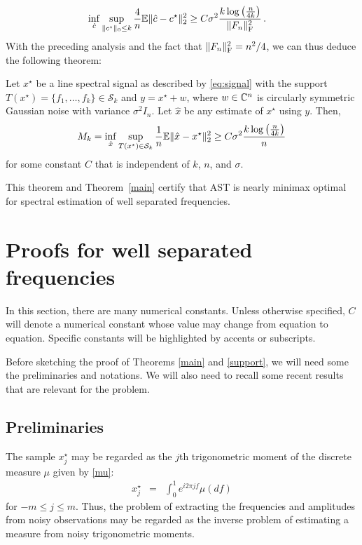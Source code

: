 \begin{align*}
\inf_{\hat{c}}
 \sup_{\lVert c^\star\rVert_0 \leq k} \frac{4}{n} \mathbb{E} \lVert\hat{c} - c^\star\rVert_2^2&\geq {C} \sigma^2 \frac{k \log\left(\frac{n}{4k}\right)}{\lVert F_n\rVert_\mathrm{F}^2}\,.
 \end{align*} With the preceding analysis and the fact that $\lVert F_n\rVert_{\mathrm{F}}^2 = n^2/4$, we can thus deduce the following theorem:
 \begin{theorem}
\label{minimax}
Let $x^\star$ be a line spectral signal as described by \eqref{eq:signal} with the support $T(x^\star) = \{f_1, \dots, f_k\} \in \mathcal{S}_k$ and $y = x^\star + w$, where $w \in \mathbb{C}^n$ is circularly symmetric Gaussian noise with variance $\sigma^2 I_n$. Let $\hat{x}$ be any estimate of $x^\star$ using $y$. Then,
\[
M_k = \inf_{\hat{x}}
 \sup_{
	T(x^\star) \in \mathcal{S}_k}
\frac{1}{n} \mathbb{E} \lVert\hat{x} - x^\star\rVert_2^2
\geq C\sigma^2 \frac{k \log\left(\frac{n}{4k}\right)}{n}
\]
for some constant $C$ that is independent of $k$, $n$, and $\sigma$.
\end{theorem}

This theorem and Theorem~\ref{main} certify that AST is nearly minimax optimal
for spectral estimation of well separated frequencies.

\section{Proofs for well separated frequencies}
\label{sec:proofs}

In this section, there are many numerical constants. Unless otherwise specified,
$C$ will denote a numerical constant whose value may change from equation to
equation. Specific constants will be highlighted by accents or subscripts.

Before sketching the proof of Theorems \ref{main} and \ref{support}, we will
need some the preliminaries and notations. We will also need to recall some
recent results that are relevant for the problem.

\subsection{Preliminaries} %
\label{sub:linespect:measures}
The sample $x^\star_j$ may be regarded as the $j$th trigonometric moment of 
the discrete measure $\mu$ given by \eqref{mu}:
\begin{eqnarray*}
  x_j^\star & = & \int_0^1 e^{i 2 \pi j f} \mu ( d f)
\end{eqnarray*}
for $-m \leq j \leq m$.
Thus, the problem of extracting the frequencies and amplitudes from noisy 
observations may be regarded as the inverse problem of estimating a measure 
from noisy trigonometric moments.

